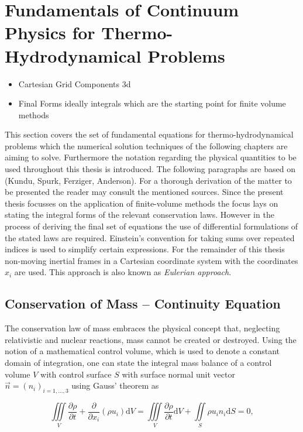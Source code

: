 
  \section{Fundamentals of Continuum Physics for Thermo-Hydrodynamical Problems}

    \begin{itemize}
        \item Cartesian Grid Components 3d
        \item Final Forms ideally integrals which are the starting point for finite volume methods
      \end{itemize}

      This section covers the set of fundamental equations for thermo-hydrodynamical problems which the numerical solution techniques of the following chapters are aiming to solve. Furthermore the notation regarding the physical quantities to be used throughout this thesis is introduced. The following paragraphs are based on (Kundu, Spurk, Ferziger, Anderson). For a thorough derivation of the matter to be presented the reader may consult the mentioned sources. Since the present thesis focusses on the application of finite-volume methods the focus lays on stating the integral forms of the relevant conservation laws. However in the process of deriving the final set of equations the use of differential formulations of the stated laws are required. Einstein's convention for taking sums over repeated indices is used to simplify certain expressions. For the remainder of this thesis non-moving inertial frames in a Cartesian coordinate system with the coordinates \( x_i \) are used. This approach is also known as \textit{Eulerian approach}.  

    \subsection{Conservation of Mass -- Continuity Equation}

    The conservation law of mass embraces the physical concept that, neglecting relativistic and nuclear reactions, mass cannot be created or destroyed. Using the notion of a mathematical control volume, which is used to denote a constant domain of integration, one can state the integral mass balance of a control volume \(V\) with control surface \(S\) with surface normal unit vector \(\vec{n} = \left( n_i \right)_{i=1,\dots,3}\) using Gauss' theorem as

    \begin{displaymath}
      \iiint\limits_V \frac{\partial \rho}{\partial t} + \frac{\partial}{\partial x_i}\left( \rho u_i \right) \mathrm{d}V 
      =  \iiint\limits_V \frac{\partial \rho}{\partial t} \mathrm{d}V + \iint\limits_S \rho u_i n_i \mathrm{d}S
      = 0,
    \end{displaymath}

